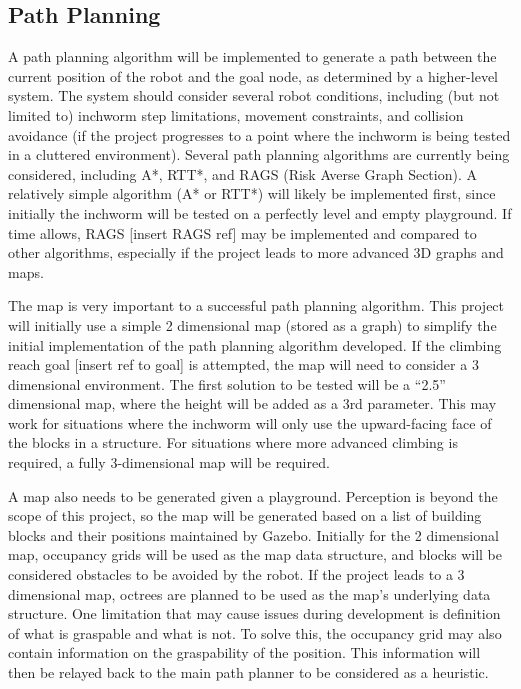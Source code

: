 \subsection{Path Planning}
A path planning algorithm will be implemented to generate a path between the current position of the robot and the goal node, as determined by a higher-level system. The system should consider several robot conditions, including (but not limited to) inchworm step limitations, movement constraints, and collision avoidance (if the project progresses to a point where the inchworm is being tested in a cluttered environment). Several path planning algorithms are currently being considered, including A*, RTT*, and RAGS (Risk Averse Graph Section). A relatively simple algorithm (A* or RTT*) will likely be implemented first, since initially the inchworm will be tested on a perfectly level and empty playground. If time allows, RAGS [insert RAGS ref] may be implemented and compared to other algorithms, especially if the project leads to more advanced 3D graphs and maps.

The map is very important to a successful path planning algorithm. This project will initially use a simple 2 dimensional map (stored as a graph) to simplify the initial implementation of the path planning algorithm developed. If the climbing reach goal [insert ref to goal] is attempted, the map will need to consider a 3 dimensional environment. The first solution to be tested will be a “2.5” dimensional map, where the height will be added as a 3rd parameter. This may work for situations where the inchworm will only use the upward-facing face of the blocks in a structure. For situations where more advanced climbing is required, a fully 3-dimensional map will be required.

A map also needs to be generated given a playground. Perception is beyond the scope of this project, so the map will be generated based on a list of building blocks and their positions maintained by Gazebo. Initially for the 2 dimensional map, occupancy grids will be used as the map data structure, and blocks will be considered obstacles to be avoided by the robot. If the project leads to a 3 dimensional map, octrees are planned to be used as the map’s underlying data structure. One limitation that may cause issues during development is definition of what is graspable and what is not. To solve this, the occupancy grid may also contain information on the graspability of the position. This information will then be relayed back to the main path planner to be considered as a heuristic.

